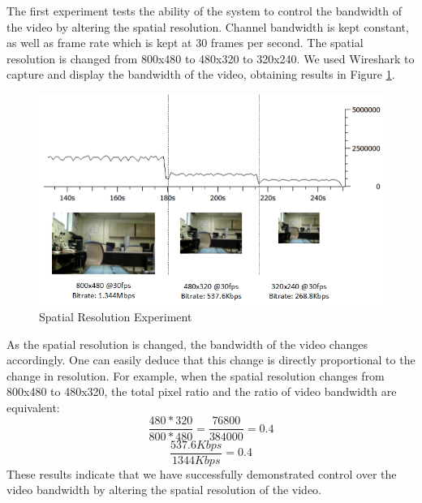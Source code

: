 \documentclass[3p,times,procedia]{elsarticle}
\begin{document}
The first experiment tests the ability of the system to control the bandwidth of the video by altering the spatial resolution. Channel bandwidth is kept constant, as well as frame rate which is kept at 30 frames per second. The spatial resolution is changed from 800x480 to 480x320 to 320x240. We used Wireshark to capture and display the bandwidth of the video, obtaining results in Figure \ref{fig:SpatialTest}.
\begin{figure}[H]
\centering
\includegraphics[width=0.8\linewidth]{SpatialResolutionTest.png}
\caption{Spatial Resolution Experiment}
\label{fig:SpatialTest}
\end{figure}
As the spatial resolution is changed, the bandwidth of the video changes accordingly. One can easily deduce that this change is directly proportional to the change in resolution. For example, when the spatial resolution changes from 800x480 to 480x320, the total pixel ratio and the ratio of video bandwidth are equivalent:
\[ \frac{480 * 320}{800 * 480} = \frac{76800}{384000} = 0.4 \]
\[ \frac{537.6Kbps}{1344Kbps} = 0.4 \]
These results indicate that we have successfully demonstrated control over the video bandwidth by altering the spatial resolution of the video. 
\end{document}
